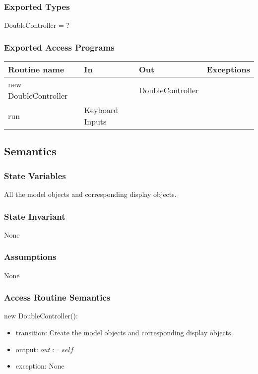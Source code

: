 \documentclass[12pt]{article}
\begin{document}
\subsubsection*{Exported Types}
DoubleController = ?
\subsubsection*{Exported Access Programs}
\begin{tabular}{| l | l | l | p{5cm} |}
\hline
\textbf{Routine name} & \textbf{In} & \textbf{Out} & \textbf{Exceptions}\\
\hline
new DoubleController &  & DoubleController & \\
\hline
run & Keyboard Inputs &  & \\
\hline
\end{tabular}

\subsection*{Semantics}
\subsubsection*{State Variables}
All the model objects and corresponding display objects.
\subsubsection*{State Invariant}
None
\subsubsection*{Assumptions}
None
\subsubsection*{Access Routine Semantics}
\noindent new DoubleController():
\begin{itemize}
\item transition: Create the model objects and corresponding display objects.
\item output: $out := \mathit{self}$
\item exception: None
\end{itemize}
\end{document}
